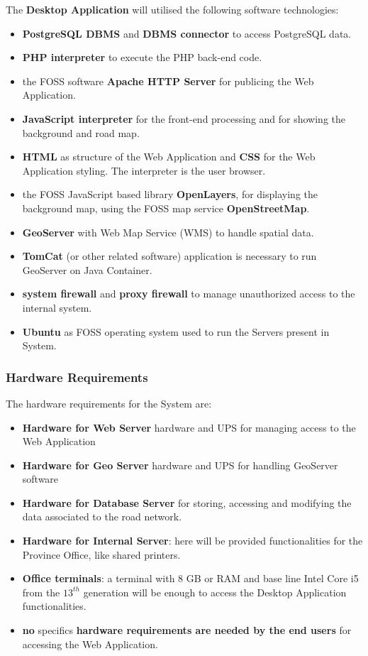 \newpage

The \textbf{Desktop Application} will utilised the following software technologies:
\begin{itemize}
    \item \textbf{PostgreSQL DBMS} and \textbf{DBMS connector} to access PostgreSQL data.
    \item \textbf{PHP interpreter} to execute the PHP back-end code.
    \item the FOSS software \textbf{Apache HTTP Server} for publicing the Web Application. 
    \item \textbf{JavaScript interpreter} for the front-end processing and for showing the background and road map.
    \item \textbf{HTML} as structure of the Web Application and \textbf{CSS} for the Web Application styling. The interpreter is the user browser.
    \item the FOSS JavaScript based library \textbf{OpenLayers}, for displaying the background map, using the FOSS map service \textbf{OpenStreetMap}.
    \item \textbf{GeoServer} with Web Map Service (WMS) to handle spatial data.
    \item \textbf{TomCat} (or other related software) application is necessary to run GeoServer on Java Container.
    \item \textbf{system firewall} and \textbf{proxy firewall} to manage unauthorized access to the internal system.
    \item \textbf{Ubuntu} as FOSS operating system used to run the Servers present in System. 
\end{itemize}

\subsubsection{Hardware Requirements}
The hardware requirements for the System are:
\begin{itemize}
    \item \textbf{Hardware for Web Server} hardware and UPS for managing access to the Web Application
     \item \textbf{Hardware for Geo Server} hardware and UPS for handling GeoServer software
     \item \textbf{Hardware for Database Server} for storing, accessing and modifying the data associated to the road network.
     \item \textbf{Hardware for Internal Server}: here will be provided functionalities for the Province Office, like shared printers.
     \item \textbf{Office terminals}: a terminal with 8 GB or RAM and base line Intel Core i5 from the $13^{th}$ generation will be enough to access the Desktop Application functionalities.
     \item \textbf{no} specifics \textbf{hardware requirements are needed by the end users} for accessing the Web Application.
\end{itemize}

